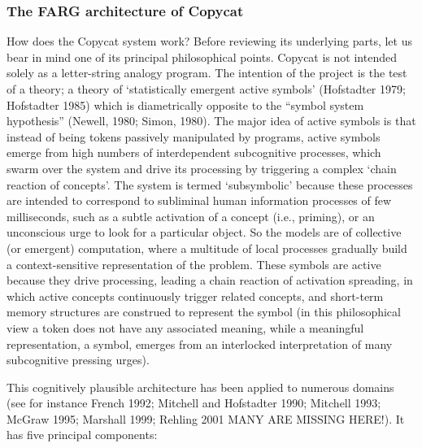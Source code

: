 \documentclass[a4paper]{article}
\begin{document}
\subsubsection{The FARG architecture of Copycat}

How does the Copycat system work?  Before reviewing its underlying parts, let us bear in mind one of its principal philosophical points.  Copycat is not intended solely as a letter-string analogy program.  The intention of the project is the test of a theory; a theory of `statistically emergent active symbols’ (Hofstadter 1979; Hofstadter 1985) which is diametrically opposite to the “symbol system hypothesis” (Newell, 1980; Simon, 1980).  The major idea of active symbols is that instead of being tokens passively manipulated by programs, active symbols emerge from high numbers of interdependent subcognitive processes, which swarm over the system and drive its processing by triggering a complex `chain reaction of concepts’.  The system is termed `subsymbolic’ because these processes are intended to correspond to subliminal human information processes of few milliseconds, such as a subtle activation of a concept (i.e., priming), or an unconscious urge to look for a particular object.  So the models are of collective (or emergent) computation, where a multitude of local processes gradually build a context-sensitive representation of the problem. These symbols are active because they drive processing, leading a chain reaction of activation spreading, in which active concepts continuously trigger related concepts, and short-term memory structures are construed to represent the symbol (in this philosophical view a token does not have any associated meaning, while a meaningful representation, a symbol, emerges from an interlocked interpretation of many subcognitive pressing urges).  

This cognitively plausible architecture has been applied to numerous domains (see for instance French 1992; Mitchell and Hofstadter 1990; Mitchell 1993; McGraw 1995; Marshall 1999; Rehling 2001 MANY ARE MISSING HERE!). It has five principal components: 
\end{document}
